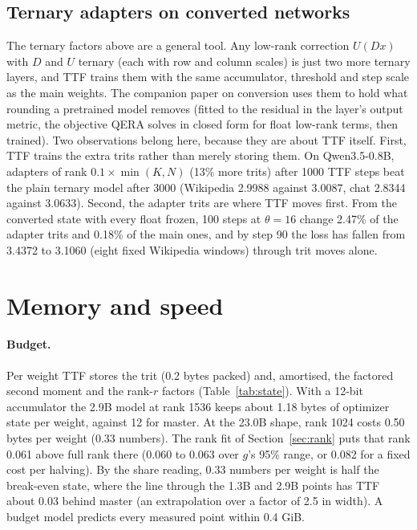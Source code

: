 \documentclass[10pt,twocolumn]{article}
\begin{document}
\subsection{Ternary adapters on converted networks}\label{sec:tadapt1}
The ternary factors above are a general tool. Any low-rank correction $U(Dx)$ with $D$ and $U$ ternary (each with row
and column scales) is just two more ternary layers, and TTF trains them with the same accumulator, threshold and step
scale as the main weights. The companion paper on conversion uses them to hold what rounding a pretrained model
removes (fitted to the residual in the layer's output metric, the objective QERA \citep{zhang2025qera} solves in closed
form for float low-rank terms, then trained). Two observations belong here, because
they are about TTF itself. First, TTF trains the extra trits rather than merely storing them. On Qwen3.5-0.8B,
adapters of rank $0.1\times\min(K,N)$ (13\% more trits) after 1000 TTF steps beat the plain ternary model after 3000
(Wikipedia 2.9988 against 3.0087, chat 2.8344 against 3.0633). Second, the adapter trits are where TTF moves first. From
the converted state with every float frozen, 100 steps at $\theta=16$ change 2.47\% of the adapter trits and 0.18\% of
the main ones, and by step 90 the loss has fallen from 3.4372 to 3.1060 (eight fixed Wikipedia windows) through trit
moves alone.

\section{Memory and speed}\label{sec:memory}
\paragraph{Budget.} Per weight TTF stores the trit (0.2 bytes packed) and, amortised, the factored second moment and the
rank-$r$ factors (Table~\ref{tab:state}). With a 12-bit accumulator the 2.9B model at rank 1536 keeps about 1.18 bytes
of optimizer state per weight, against 12 for master. At the 23.0B shape, rank 1024 costs 0.50 bytes per weight (0.33
numbers). The rank fit of Section~\ref{sec:rank} puts that rank 0.061 above full rank there (0.060 to 0.063 over $g$'s
95\% range, or 0.082 for a fixed cost per halving). By the share reading, 0.33 numbers per weight is half the
break-even state, where the line through the 1.3B and 2.9B points has TTF about 0.03 behind master (an extrapolation
over a factor of 2.5 in width). A budget model predicts every measured point within 0.4 GiB.
\end{document}
